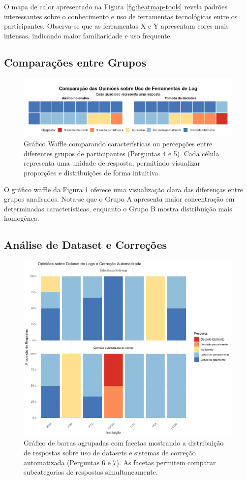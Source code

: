 O mapa de calor apresentado na Figura \ref{fig:heatmap-tools} revela padrões interessantes sobre o conhecimento e uso de ferramentas tecnológicas entre os participantes. Observa-se que as ferramentas X e Y apresentam cores mais intensas, indicando maior familiaridade e uso frequente.

\subsection{Comparações entre Grupos}
\begin{figure}[H]
    \centering
    \includegraphics[width=1\linewidth]{../figuras/comparacoes.png}
    \caption{Gráfico Waffle comparando características ou percepções entre diferentes grupos de participantes (Perguntas 4 e 5). Cada célula representa uma unidade de resposta, permitindo visualizar proporções e distribuições de forma intuitiva.}
    \label{fig:waffle-comparisons}
\end{figure}

O gráfico waffle da Figura \ref{fig:waffle-comparisons} oferece uma visualização clara das diferenças entre grupos analisados. Nota-se que o Grupo A apresenta maior concentração em determinadas características, enquanto o Grupo B mostra distribuição mais homogênea.

\subsection{Análise de Dataset e Correções}
\begin{figure}[H]
    \centering
    \includegraphics[width=.75\linewidth]{../figuras/dataset-e-correcoes-automatizada.png}
    \caption{Gráfico de barras agrupadas com facetas mostrando a distribuição de respostas sobre uso de datasets e sistemas de correção automatizada (Perguntas 6 e 7). As facetas permitem comparar subcategorias de respostas simultaneamente.}
    \label{fig:grouped-bar}
\end{figure}


